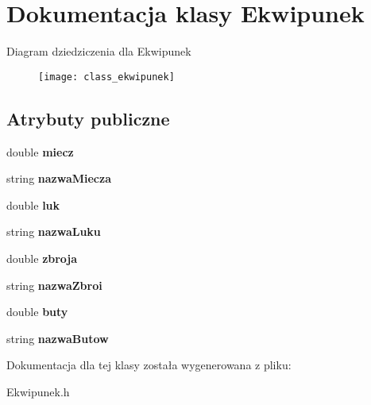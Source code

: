 \hypertarget{class_ekwipunek}{}\section{Dokumentacja klasy Ekwipunek}
\label{class_ekwipunek}
Diagram dziedziczenia dla Ekwipunek\begin{figure}[H]
\begin{center}
\leavevmode
\texttt{[image: class\_ekwipunek]}
\end{center}
\end{figure}
\subsection*{Atrybuty publiczne}
\begin{DoxyCompactItemize}
\item 
double {\bfseries miecz}\hypertarget{class_ekwipunek_aca4975f90530d108ae70fb56145c1763}{}\label{class_ekwipunek_aca4975f90530d108ae70fb56145c1763}

\item 
string {\bfseries nazwa\+Miecza}\hypertarget{class_ekwipunek_a3d8fdbdf8c9b1a28187840a8ad5e1493}{}\label{class_ekwipunek_a3d8fdbdf8c9b1a28187840a8ad5e1493}

\item 
double {\bfseries luk}\hypertarget{class_ekwipunek_abaf53911fe252142e6de98036e0499c9}{}\label{class_ekwipunek_abaf53911fe252142e6de98036e0499c9}

\item 
string {\bfseries nazwa\+Luku}\hypertarget{class_ekwipunek_a8f9339fade90a85b6ff678a0cb93c61a}{}\label{class_ekwipunek_a8f9339fade90a85b6ff678a0cb93c61a}

\item 
double {\bfseries zbroja}\hypertarget{class_ekwipunek_a4b3354debef86467e856ea0a06cc980f}{}\label{class_ekwipunek_a4b3354debef86467e856ea0a06cc980f}

\item 
string {\bfseries nazwa\+Zbroi}\hypertarget{class_ekwipunek_a455a15b265037ca6140a7e2d3b7d4101}{}\label{class_ekwipunek_a455a15b265037ca6140a7e2d3b7d4101}

\item 
double {\bfseries buty}\hypertarget{class_ekwipunek_a1f627e7d9f730776c37cce40522c82eb}{}\label{class_ekwipunek_a1f627e7d9f730776c37cce40522c82eb}

\item 
string {\bfseries nazwa\+Butow}\hypertarget{class_ekwipunek_a2aafba446378a5eddda44f538c1cf4e5}{}\label{class_ekwipunek_a2aafba446378a5eddda44f538c1cf4e5}

\end{DoxyCompactItemize}


Dokumentacja dla tej klasy została wygenerowana z pliku\+:\begin{DoxyCompactItemize}
\item 
Ekwipunek.\+h\end{DoxyCompactItemize}

